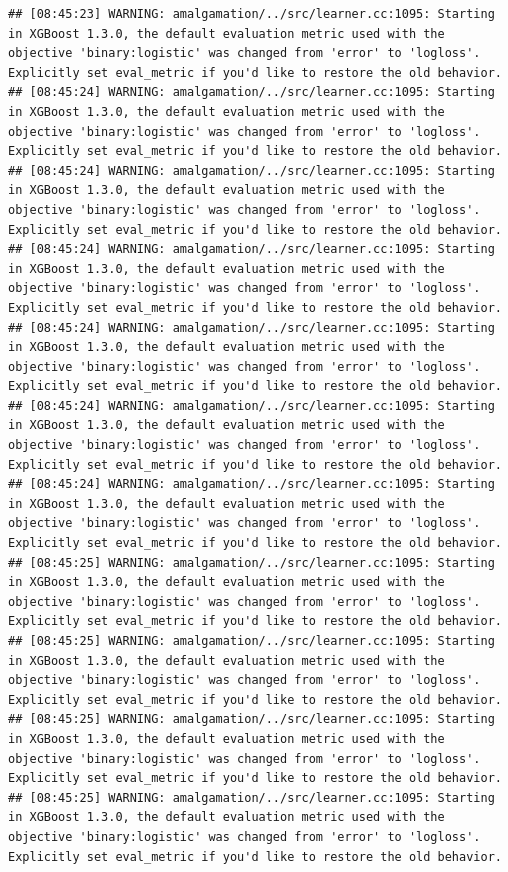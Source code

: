 \documentclass[
]{scrbook}
\begin{document}
\begin{verbatim}
## [08:45:23] WARNING: amalgamation/../src/learner.cc:1095: Starting in XGBoost 1.3.0, the default evaluation metric used with the objective 'binary:logistic' was changed from 'error' to 'logloss'. Explicitly set eval_metric if you'd like to restore the old behavior.
## [08:45:24] WARNING: amalgamation/../src/learner.cc:1095: Starting in XGBoost 1.3.0, the default evaluation metric used with the objective 'binary:logistic' was changed from 'error' to 'logloss'. Explicitly set eval_metric if you'd like to restore the old behavior.
## [08:45:24] WARNING: amalgamation/../src/learner.cc:1095: Starting in XGBoost 1.3.0, the default evaluation metric used with the objective 'binary:logistic' was changed from 'error' to 'logloss'. Explicitly set eval_metric if you'd like to restore the old behavior.
## [08:45:24] WARNING: amalgamation/../src/learner.cc:1095: Starting in XGBoost 1.3.0, the default evaluation metric used with the objective 'binary:logistic' was changed from 'error' to 'logloss'. Explicitly set eval_metric if you'd like to restore the old behavior.
## [08:45:24] WARNING: amalgamation/../src/learner.cc:1095: Starting in XGBoost 1.3.0, the default evaluation metric used with the objective 'binary:logistic' was changed from 'error' to 'logloss'. Explicitly set eval_metric if you'd like to restore the old behavior.
## [08:45:24] WARNING: amalgamation/../src/learner.cc:1095: Starting in XGBoost 1.3.0, the default evaluation metric used with the objective 'binary:logistic' was changed from 'error' to 'logloss'. Explicitly set eval_metric if you'd like to restore the old behavior.
## [08:45:24] WARNING: amalgamation/../src/learner.cc:1095: Starting in XGBoost 1.3.0, the default evaluation metric used with the objective 'binary:logistic' was changed from 'error' to 'logloss'. Explicitly set eval_metric if you'd like to restore the old behavior.
## [08:45:25] WARNING: amalgamation/../src/learner.cc:1095: Starting in XGBoost 1.3.0, the default evaluation metric used with the objective 'binary:logistic' was changed from 'error' to 'logloss'. Explicitly set eval_metric if you'd like to restore the old behavior.
## [08:45:25] WARNING: amalgamation/../src/learner.cc:1095: Starting in XGBoost 1.3.0, the default evaluation metric used with the objective 'binary:logistic' was changed from 'error' to 'logloss'. Explicitly set eval_metric if you'd like to restore the old behavior.
## [08:45:25] WARNING: amalgamation/../src/learner.cc:1095: Starting in XGBoost 1.3.0, the default evaluation metric used with the objective 'binary:logistic' was changed from 'error' to 'logloss'. Explicitly set eval_metric if you'd like to restore the old behavior.
## [08:45:25] WARNING: amalgamation/../src/learner.cc:1095: Starting in XGBoost 1.3.0, the default evaluation metric used with the objective 'binary:logistic' was changed from 'error' to 'logloss'. Explicitly set eval_metric if you'd like to restore the old behavior.
\end{verbatim}
\end{document}
